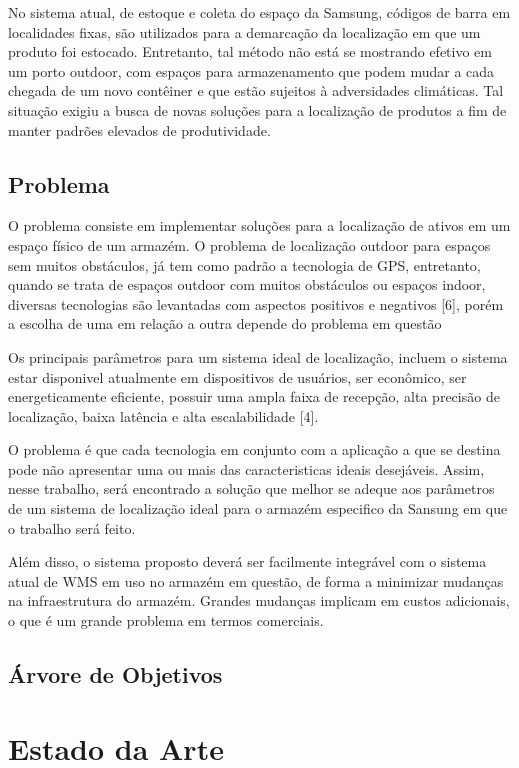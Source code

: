 \documentclass[]{politex}
\begin{document}
No sistema atual, de estoque e coleta do espaço da Samsung, códigos de barra em localidades fixas, são utilizados para a demarcação da localização em que um produto foi estocado. Entretanto, tal método não está se mostrando efetivo em um porto outdoor, com espaços para armazenamento que podem mudar a cada chegada de um novo contêiner e que estão sujeitos à adversidades climáticas. Tal situação exigiu a busca de novas soluções para a localização de produtos a fim de manter padrões elevados de produtividade.

\chapter{Problema}
O problema consiste em implementar soluções para a localização de ativos em um espaço físico de um armazém.
O problema de localização outdoor para espaços sem muitos obstáculos, já tem como padrão a tecnologia de GPS, entretanto, quando se trata de espaços outdoor com muitos obstáculos ou espaços indoor, diversas tecnologias são levantadas com aspectos positivos e negativos [6], porém a escolha de uma em relação a outra depende do problema em questão

Os principais parâmetros para um sistema ideal de localização, incluem o sistema estar disponivel atualmente em dispositivos de usuários, ser econômico, ser energeticamente eficiente, possuir uma ampla faixa de recepção, alta precisão de localização, baixa latência e alta escalabilidade [4].

O problema é que cada tecnologia em conjunto com a aplicação a que se destina pode não apresentar uma ou mais das caracteristicas ideais desejáveis. Assim, nesse trabalho, será encontrado a solução que melhor se adeque aos parâmetros de um sistema de localização ideal para o armazém especifico da Sansung em que o trabalho será feito.

Além disso, o sistema proposto deverá ser facilmente integrável com o sistema atual de WMS em uso no armazém em questão, de forma a minimizar mudanças na infraestrutura do armazém. Grandes mudanças implicam em custos adicionais, o que é um grande problema em termos comerciais.

\chapter{Árvore de Objetivos}

\part{Estado da Arte}
\end{document}
